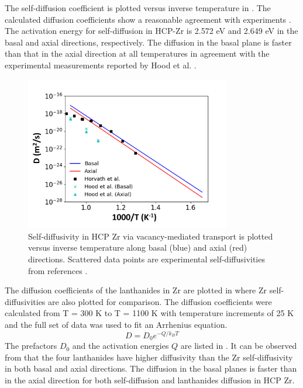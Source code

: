 \documentclass[preprint,12pt]{elsarticle}
\begin{document}
The self-diffusion coefficient is plotted versus inverse temperature in . The calculated diffusion coefficients show a reasonable agreement with experiments \cite{hood_self-_1997, horvath_anomalous_1984}. The activation energy for self-diffusion in HCP-Zr is 2.572 eV and 2.649 eV in the basal and axial directions, respectively. The diffusion in the basal plane is faster than that in the axial direction at all temperatures in agreement with the experimental measurements reported by Hood et al. \cite{hood_self-_1997}.

\begin{figure}[h!]
    \centering
    \includegraphics[width=0.8\textwidth]{self_diff_updated.jpg}
    \caption{Self-diffusivity in HCP Zr via vacancy-mediated transport is plotted versus inverse temperature along basal (blue) and axial (red) directions. Scattered data points are experimental self-diffusivities from references \cite{hood_self-_1997, horvath_anomalous_1984}.}
    \label{fig:self_diff}
\end{figure}

The diffusion coefficients of the lanthanides in Zr are plotted in  where Zr self-diffusivities are also plotted for comparison.  The diffusion coefficients were calculated from T = 300 K to T = 1100 K with temperature increments of 25 K and the full set of data was used to fit an Arrhenius equation.
\begin{equation}
    D = D_0 e^{-Q/{k_B T}}
\end{equation}
The prefactors $D_0$ and the activation energies $Q$ are listed in . It can be observed from  that the four lanthanides have higher diffusivity than the Zr self-diffusivity in both basal and axial directions. The diffusion in the basal planes is faster than in the axial direction for both self-diffusion and lanthanides diffusion in HCP Zr.
\end{document}
